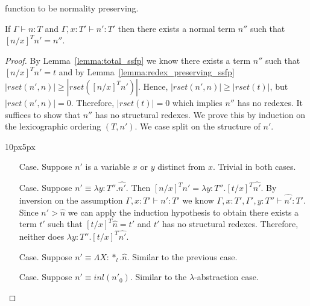 function to be normality preserving.
\begin{lemma}
  \label{corollary:normalization_preserving_ssfp}
  If $\Gamma \vdash n:T$ and $\Gamma, x:T' \vdash n':T'$ then there exists 
  a normal term $n''$ such that $[n/x]^T n' = n''$.
\end{lemma}
\begin{proof}
  By Lemma~\ref{lemma:total_ssfp} we know there exists a term $n''$ such that $[n/x]^T n' = t$ and by 
  Lemma~\ref{lemma:redex_preserving_ssfp} 
  $|rset(n', n)| \geq |rset([n/x]^T n')|$.  Hence, $|rset(n', n)| \geq |rset(t)|$, but
  $|rset(n', n)| = 0$.  Therefore, $|rset(t)| = 0$ which implies $n''$ has no redexes.  It suffices to show
  that $n''$ has no structural redexes.  We prove this by induction on the lexicographic ordering $(T,n')$.
  We case split on the structure of $n'$.
\vspace{-25px}
\begin{changemargin}{10px}{5px}\noindent
\begin{itemize}
\item[Case.] Suppose $n'$ is a variable $x$ or $y$ distinct from $x$.  Trivial in both cases.
  
\item[Case.] Suppose $n' \equiv \lambda y:T''.\hat{n'}$.  Then
  $[n/x]^T n' = \lambda y:T''.[t/x]^T \hat{n'}$. By inversion on the assumption  
  $\Gamma, x:T' \vdash n':T'$ we know $\Gamma, x:T',\Gamma',y:T'' \vdash \hat{n'}:T'$.  Since
  $n' > \hat{n}$ we can apply the induction hypothesis to obtain there exists a term $t'$ such that
  $[t/x]^T \hat{n} = t'$ and $t'$ has no structural redexes.  Therefore, neither does 
  $\lambda y:T''.[t/x]^T \hat{n'}$.
  
\item[Case.] Suppose $n' \equiv \Lambda X:*_l.\hat{n}$.  Similar to the previous case.
  
\item[Case.] Suppose $n' \equiv inl(n'_0)$.  Similar to the $\lambda$-abstraction case.
  

\end{itemize}
\end{changemargin}
\end{proof}
